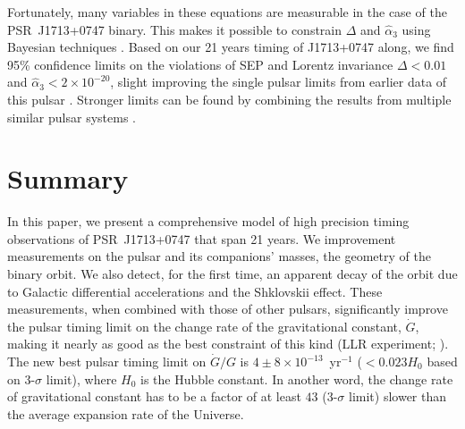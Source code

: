 Fortunately, many variables in these equations are measurable in the
case of the PSR~J1713+0747 binary. This makes it possible to constrain $\Delta$
and $\hat{\alpha}_3$ using Bayesian techniques 
\citep{sns+05, sfl+05, gsf+11}. Based on our 21 years 
timing of J1713+0747 along, we find 95\% confidence limits on the violations of SEP and
Lorentz invariance $\Delta < 0.01$ and $\hat{\alpha}_3<2\times10^{-20}$, 
slight improving the single pulsar limits from earlier data of this pulsar \citep{sfl+05, gsf+11}.
Stronger limits can be found by combining the results from
multiple similar pulsar systems \citep{wex00,sfl+05, gsf+11}.


\section{Summary}
In this paper, we present a comprehensive model of high precision timing observations of
PSR~J1713+0747 that span 21 years. 
We improvement measurements on the pulsar and its companions' masses, the
geometry of the binary orbit. We also detect, for the first time, an apparent
decay of the orbit due to Galactic differential accelerations and the Shklovskii effect.
These measurements, when combined with those of other pulsars, 
significantly improve the pulsar timing limit on the change rate of the gravitational
 constant, $\dot{G}$, making it nearly as good as the best
 constraint of this kind (LLR experiment; \citep{hmb10}).
The new best pulsar timing limit on $\dot{G}/G$ is 
$4\pm8\times10^{-13}$~yr$^{-1}$ ($<0.023H_0$ based on 3-$\sigma$ limit), where $H_0$ is the Hubble constant. 
In another word, the change rate of gravitational constant has to be a factor
of at least $43$ (3-$\sigma$ limit) slower than the average expansion rate of
the Universe.

